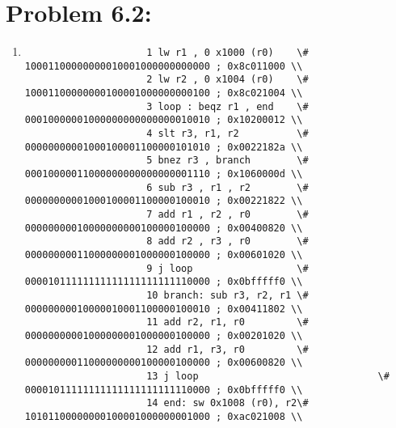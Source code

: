 \documentclass[10pt,a4paper]{article}
\begin{document}
\section*{Problem 6.2:}
\begin{enumerate}
	\item    
	\begin{verbatim}
					 1 lw r1 , 0 x1000 (r0)    \# 10001100000000010001000000000000 ; 0x8c011000 \\
					 2 lw r2 , 0 x1004 (r0)    \# 10001100000000100001000000000100 ; 0x8c021004 \\
					 3 loop : beqz r1 , end    \# 00010000001000000000000000010010 ; 0x10200012 \\
					 4 slt r3, r1, r2          \# 00000000001000100001100000101010 ; 0x0022182a \\
					 5 bnez r3 , branch        \# 00010000011000000000000000001110 ; 0x1060000d \\
					 6 sub r3 , r1 , r2        \# 00000000001000100001100000100010 ; 0x00221822 \\
					 7 add r1 , r2 , r0        \# 00000000010000000000100000100000 ; 0x00400820 \\
					 8 add r2 , r3 , r0        \# 00000000011000000001000000100000 ; 0x00601020 \\
					 9 j loop                  \# 00001011111111111111111111110000 ; 0x0bfffff0 \\
					 10 branch: sub r3, r2, r1 \# 00000000010000010001100000100010 ; 0x00411802 \\
					 11 add r2, r1, r0         \# 00000000001000000001000000100000 ; 0x00201020 \\
					 12 add r1, r3, r0         \# 00000000011000000000100000100000 ; 0x00600820 \\
					 13 j loop 	 	 	 	 	 	 	 	 \# 00001011111111111111111111110000 ; 0x0bfffff0 \\
					 14 end: sw 0x1008 (r0), r2\# 10101100000000100001000000001000 ; 0xac021008 \\
\end{verbatim}
\end{enumerate}
\end{document}

